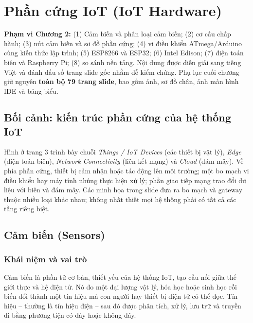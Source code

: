 \chapter{Phần cứng IoT (IoT Hardware)}\label{chap:iot-hardware}
\begin{concept}
\textbf{Phạm vi Chương 2:} (1) Cảm biến và phân loại cảm biến; (2) cơ cấu chấp hành; (3) nút cảm biến và sơ đồ phần cứng; (4) vi điều khiển ATmega/Arduino cùng kiến thức lập trình; (5) ESP8266 và ESP32; (6) Intel Edison; (7) điện toán biên và Raspberry Pi; (8) so sánh nền tảng. Nội dung được diễn giải sang tiếng Việt và đánh dấu số trang slide gốc nhằm dễ kiểm chứng. Phụ lục cuối chương giữ nguyên \textbf{toàn bộ 79 trang slide}, bao gồm ảnh, sơ đồ chân, ảnh màn hình IDE và bảng biểu.
\end{concept}
\section{Bối cảnh: kiến trúc phần cứng của hệ thống IoT}
Hình ở trang 3 trình bày chuỗi \emph{Things / IoT Devices} (các thiết bị vật lý), \emph{Edge} (điện toán biên), \emph{Network Connectivity} (liên kết mạng) và \emph{Cloud} (đám mây). Về phía phần cứng, thiết bị cảm nhận hoặc tác động lên môi trường; một bo mạch vi điều khiển hay máy tính nhúng thực hiện xử lý; phần giao tiếp mạng trao đổi dữ liệu với biên và đám mây. Các minh họa trong slide đưa ra bo mạch và gateway thuộc nhiều loại khác nhau; không nhất thiết mọi hệ thống phải có tất cả các tầng riêng biệt.
\section{Cảm biến (Sensors)}
\subsection{Khái niệm và vai trò}
Cảm biến là phần tử cơ bản, thiết yếu của hệ thống IoT, tạo cầu nối giữa thế giới thực và hệ điện tử. Nó đo một đại lượng vật lý, hóa học hoặc sinh học rồi biến đổi thành một tín hiệu mà con người hay thiết bị điện tử có thể đọc. Tín hiệu -- thường là tín hiệu điện -- sau đó được phân tích, xử lý, lưu trữ và truyền đi bằng phương tiện có dây hoặc không dây.

